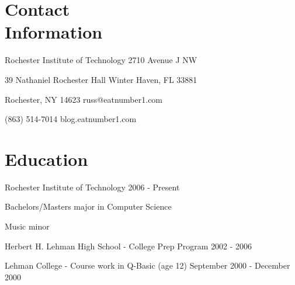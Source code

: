 \documentclass[margin,line]{resume}
\begin{document}
\begin{resume}

\section{\mysidestyle Contact \\ Information}\vspace{2mm}
	\begin{asparablank}
		\item Rochester Institute of Technology \hfill 2710 Avenue J NW
		\item 39 Nathaniel Rochester Hall \hfill Winter Haven, FL 33881
		\item Rochester, NY 14623 \hfill russ@eatnumber1.com
		\item (863) 514-7014 \hfill blog.eatnumber1.com
	\end{asparablank}

\section{\mysidestyle Education}
		\begin{compactdesc}
			\item[Rochester Institute of Technology] \hfill {\footnotesize 2006 - Present}
			\begin{compactitem}
				\item {\small Bachelors/Masters major in Computer Science}
				\item {\small Music minor}
			\end{compactitem}
			\item[Herbert H. Lehman High School] - College Prep Program \hfill
			{\footnotesize 2002 - 2006}
			\item[Lehman College] - Course work in Q-Basic (age 12) \hfill
			{\footnotesize September 2000 - December 2000}
		\end{compactdesc}


\end{resume}
\end{document}
